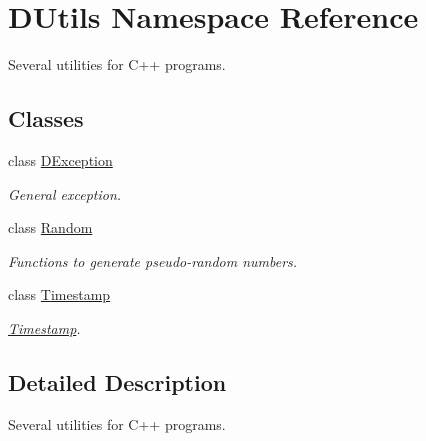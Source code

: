 \hypertarget{namespaceDUtils}{}\section{D\+Utils Namespace Reference}
\label{namespaceDUtils}


Several utilities for C++ programs.  


\subsection*{Classes}
\begin{DoxyCompactItemize}
\item 
class \hyperlink{classDUtils_1_1DException}{D\+Exception}
\begin{DoxyCompactList}\small\item\em General exception. \end{DoxyCompactList}\item 
class \hyperlink{classDUtils_1_1Random}{Random}
\begin{DoxyCompactList}\small\item\em Functions to generate pseudo-\/random numbers. \end{DoxyCompactList}\item 
class \hyperlink{classDUtils_1_1Timestamp}{Timestamp}
\begin{DoxyCompactList}\small\item\em \hyperlink{classDUtils_1_1Timestamp}{Timestamp}. \end{DoxyCompactList}\end{DoxyCompactItemize}


\subsection{Detailed Description}
Several utilities for C++ programs. 